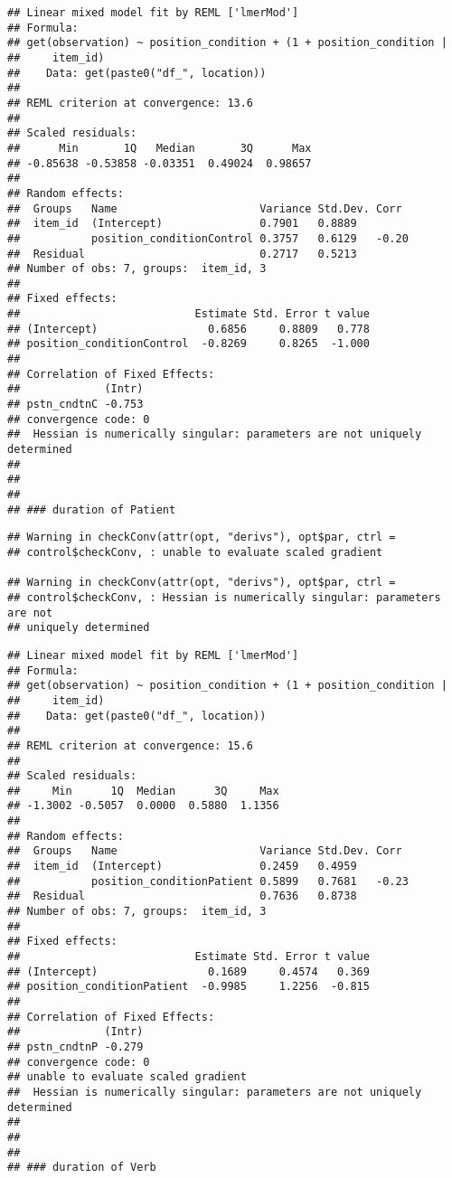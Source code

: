 \documentclass[]{article}
\begin{document}
\begin{verbatim}
## Linear mixed model fit by REML ['lmerMod']
## Formula: 
## get(observation) ~ position_condition + (1 + position_condition |  
##     item_id)
##    Data: get(paste0("df_", location))
## 
## REML criterion at convergence: 13.6
## 
## Scaled residuals: 
##      Min       1Q   Median       3Q      Max 
## -0.85638 -0.53858 -0.03351  0.49024  0.98657 
## 
## Random effects:
##  Groups   Name                      Variance Std.Dev. Corr 
##  item_id  (Intercept)               0.7901   0.8889        
##           position_conditionControl 0.3757   0.6129   -0.20
##  Residual                           0.2717   0.5213        
## Number of obs: 7, groups:  item_id, 3
## 
## Fixed effects:
##                           Estimate Std. Error t value
## (Intercept)                 0.6856     0.8809   0.778
## position_conditionControl  -0.8269     0.8265  -1.000
## 
## Correlation of Fixed Effects:
##             (Intr)
## pstn_cndtnC -0.753
## convergence code: 0
##  Hessian is numerically singular: parameters are not uniquely determined
## 
##   
##   
## ### duration of Patient
\end{verbatim}

\begin{verbatim}
## Warning in checkConv(attr(opt, "derivs"), opt$par, ctrl =
## control$checkConv, : unable to evaluate scaled gradient

## Warning in checkConv(attr(opt, "derivs"), opt$par, ctrl =
## control$checkConv, : Hessian is numerically singular: parameters are not
## uniquely determined
\end{verbatim}

\begin{verbatim}
## Linear mixed model fit by REML ['lmerMod']
## Formula: 
## get(observation) ~ position_condition + (1 + position_condition |  
##     item_id)
##    Data: get(paste0("df_", location))
## 
## REML criterion at convergence: 15.6
## 
## Scaled residuals: 
##     Min      1Q  Median      3Q     Max 
## -1.3002 -0.5057  0.0000  0.5880  1.1356 
## 
## Random effects:
##  Groups   Name                      Variance Std.Dev. Corr 
##  item_id  (Intercept)               0.2459   0.4959        
##           position_conditionPatient 0.5899   0.7681   -0.23
##  Residual                           0.7636   0.8738        
## Number of obs: 7, groups:  item_id, 3
## 
## Fixed effects:
##                           Estimate Std. Error t value
## (Intercept)                 0.1689     0.4574   0.369
## position_conditionPatient  -0.9985     1.2256  -0.815
## 
## Correlation of Fixed Effects:
##             (Intr)
## pstn_cndtnP -0.279
## convergence code: 0
## unable to evaluate scaled gradient
##  Hessian is numerically singular: parameters are not uniquely determined
## 
##   
##   
## ### duration of Verb
\end{verbatim}
\end{document}
